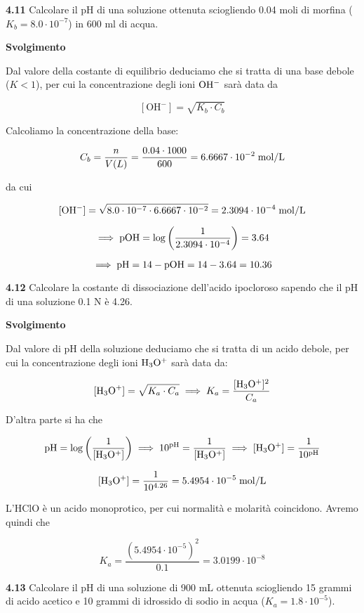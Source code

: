 \vspace{0.2cm}\textbf{4.11} Calcolare il pH di una soluzione ottenuta sciogliendo 0.04 moli di morfina ($K_b = 8.0 \cdot 10^{-7}$) in 600 ml di acqua.

\vspace{0.2cm}\large\textbf{Svolgimento}\normalsize

\vspace{0.2cm}Dal valore della costante di equilibrio deduciamo che si tratta di una base debole ($K<1$), per cui la concentrazione degli ioni $\rm OH^-$ sarà data da

$$[\text{OH}^-]=\sqrt{K_b \cdot C_b}$$

Calcoliamo la concentrazione della base:

$$C_b=\frac{n}{V(L)}=
\frac{0.04 \cdot 1000}{600}=6.6667 \cdot 10^{-2} \; \rm mol/L$$

da cui

$$\rm [OH^-]=\sqrt{8.0 \cdot 10^{-7} \cdot 6.6667 \cdot 10^{-2}}
=2.3094 \cdot 10^{-4} \; \rm mol/L$$

$$\implies \rm pOH=\log{\left(\frac{1}{2.3094 \cdot 10^{-4}}\right)}
=3.64$$

$$\implies \rm pH=14 - pOH
=14-3.64=10.36$$

\vspace{0.2cm}\textbf{4.12} Calcolare la costante di dissociazione dell'acido ipocloroso sapendo che il pH di una soluzione 0.1 N è 4.26.

\vspace{0.2cm}\large\textbf{Svolgimento}\normalsize

\vspace{0.2cm}Dal valore di pH della soluzione deduciamo che si tratta di un acido debole, per cui la concentrazione degli ioni $\rm H_3O^+$ sarà data da:

$$[\text{H}_3\text{O}^+]=\sqrt{K_a \cdot C_a}
\implies
K_a=\frac{[\rm H_3O^+]^2}{C_a}$$

D'altra parte si ha che

$$\rm pH=\log{\left( \frac{1}{[H_3O^+]} \right)}
\implies
10^{pH}=\frac{1}{[H_3O^+]}
\implies
[H_3O^+]=\frac{1}{10^{pH}}$$

$$\rm [H_3O^+]=\frac{1}{10^{4.26}}=5.4954 \cdot 10^{-5} \; \rm mol/L$$

L'HClO è un acido monoprotico, per cui normalità e molarità coincidono. Avremo quindi che

$$K_a=\frac{(5.4954 \cdot 10^{-5})^2}{0.1}
=3.0199 \cdot 10^{-8}$$

\vspace{0.2cm}\textbf{4.13} Calcolare il pH di una soluzione di 900 mL ottenuta sciogliendo 15 grammi di acido acetico e 10 grammi di idrossido di sodio in acqua ($K_a = 1.8 \cdot 10^{-5}$).

